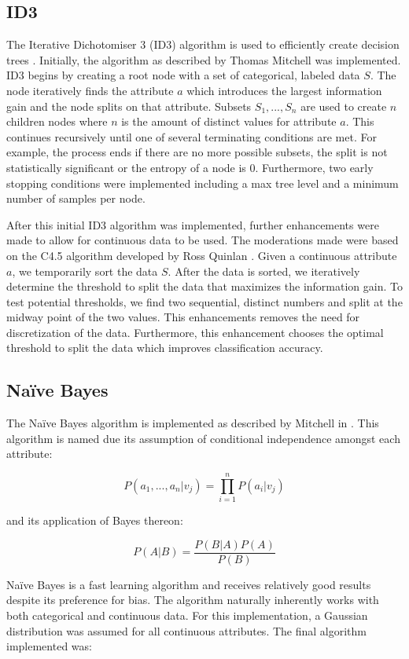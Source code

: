 \documentclass[11pt]{article}
\begin{document}
\subsection{ID3}
The Iterative Dichotomiser 3 (ID3) algorithm is used to efficiently create decision trees \cite{Quinlan:1986:IDT:637962.637969}. Initially, the algorithm as described by Thomas Mitchell \cite{Mitchell:1997:ML:541177} was implemented. ID3 begins by creating a root node with a set of categorical, labeled data $S$. The node iteratively finds the attribute $a$ which introduces the largest information gain and the node splits on that attribute. Subsets ${S_1,...,S_n}$ are used to create $n$ children nodes where $n$ is the amount of distinct values for attribute $a$. This continues recursively until one of several terminating conditions are met. For example, the process ends if there are no more possible subsets, the split is not statistically significant or the entropy of a node is $0$. Furthermore, two early stopping conditions were implemented including a max tree level and a minimum number of samples per node.

After this initial ID3 algorithm was implemented, further enhancements were made to allow for continuous data to be used. The moderations made were based on the C4.5 algorithm developed by Ross Quinlan \citep{c45algorithm}. Given a continuous attribute $a$, we temporarily sort the data $S$. After the data is sorted, we iteratively determine the threshold to split the data that maximizes the information gain. To test potential thresholds, we find two sequential, distinct numbers and split at the midway point of the two values. This enhancements removes the need for discretization of the data. Furthermore, this enhancement chooses the optimal threshold to split the data which improves classification accuracy.

\subsection{Naïve Bayes}
The Naïve Bayes algorithm is implemented as described by Mitchell in \cite{Mitchell:1997:ML:541177}. This algorithm is named due its assumption of conditional independence amongst each attribute:

$$P(a_1,...,a_n|v_j) = \prod_{i=1}^{n}P(a_i|v_j)$$

and its application of Bayes thereon:

$$P(A|B) = \frac{P(B|A)P(A)}{P(B)}$$

Naïve Bayes is a fast learning algorithm and receives relatively good results despite its preference for bias. The algorithm naturally inherently works with both categorical and continuous data. For this implementation, a Gaussian distribution was assumed for all continuous attributes. The final algorithm implemented was:
\end{document}
